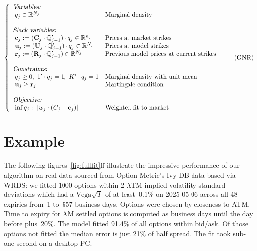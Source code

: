 \documentclass[twoside]{article}
\DeclareRobustCommand{\R}{\mathbb{R}}
\theoremstyle{plain}
\theoremstyle{definition}
\theoremstyle{remark}
\begin{document}
\begin{equation}\label{eq:GENR}
\left\{
    \begin{array}{lll}
        \mbox{\textsl{Variables:}}
        \\
        \hspace{0.1cm}q_j \in \R^{N_j} & \mbox{Marginal density}\\
        \\
        \mbox{\textsl{Slack variables:}}\\
        \hspace{0.1cm}\mathbf{c}_j := ( \mathbf{C}_j \cdot \Q_{j-1}' )\cdot q_j \in \R^{n_j} & \mbox{Prices at market strikes}\\
        \hspace{0.1cm}\mathbf{u}_j := ( \mathbf{U}_j \cdot \Q_{j-1}' )\cdot q_j  \in \R^{N_j}  & \mbox{Prices at model strikes}\\
        \hspace{0.1cm}\mathbf{r}_j := ( \mathbf{R}_j \cdot \Q_{j-1}' ) \in \R^{N_j} & \mbox{Previous model prices at current strikes}\\
        \\
        \mbox{\textsl{Constraints:}} \\
            \hspace{0.1cm}q_j \geq 0 , \ 1'\cdot q_j = 1,  \ K'\cdot q_j = 1 & \mbox{Marginal 
            density with unit mean}\\
            \hspace{0.1cm}\mathbf{u}_j \geq \mathbf{r}_j & \mbox{Martingale 
            condition}\\ \\
        \mbox{\textsl{Objective:}} \\
        \hspace{0.1cm}\inf q_j:\ \left| w_j\cdot (C_j -\mathbf{c}_j)  \right| 
        & \mbox{Weighted fit to market}
    \end{array}
    \right. \tag{GNR}
\end{equation}

\section{Example}

The following figures~\ref{fig:fullfit}ff illustrate the impressive performance of our algorithm on real data 
sourced from Option Metric's Ivy DB data based via WRDS:
we fitted 1000 options within 2 ATM implied volatility standard deviations which had a $\mathrm{Vega}\sqrt{T}$ of at least~0.1\%
on 2025-05-06 across all 48 expiries from~1 to~657 business days. Options were chosen by closeness to ATM. Time to expiry
for AM settled options is computed as business days until the day before plus~20\%.
The model fitted 91.4\% of all options within bid/ask.
Of those options not fitted the median error is just 21\% of half spread. The fit took sub-one second on a desktop PC.
\end{document}
